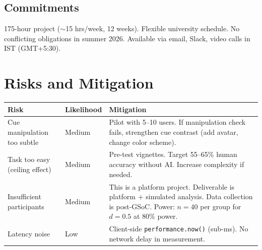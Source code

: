 \documentclass[12pt]{article}
\begin{document}
\subsection{Commitments}

175-hour project ($\sim$15 hrs/week, 12 weeks). Flexible university schedule. No conflicting obligations in summer 2026. Available via email, Slack, video calls in IST (GMT+5:30).

\section{Risks and Mitigation}

\begin{table}[H]
\centering
\small
\begin{tabular}{p{}p{}p{}}
\toprule
Risk & Likelihood & Mitigation \\
\midrule
Cue manipulation too subtle & Medium & Pilot with 5--10 users. If manipulation check fails, strengthen cue contrast (add avatar, change color scheme). \\[0.8em]
Task too easy (ceiling effect) & Medium & Pre-test vignettes. Target 55--65\% human accuracy without AI. Increase complexity if needed. \\[0.8em]
Insufficient participants & Medium & This is a platform project. Deliverable is platform + simulated analysis. Data collection is post-GSoC. Power: $n=40$ per group for $d=0.5$ at 80\% power. \\[0.8em]
Latency noise & Low & Client-side \texttt{performance.now()} (sub-ms). No network delay in measurement. \\
\bottomrule
\end{tabular}
\end{table}
\end{document}
